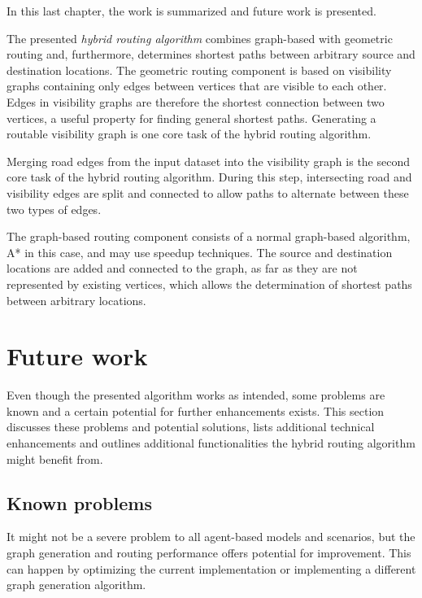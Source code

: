 
In this last chapter, the work is summarized and future work is presented.

The presented \emph{hybrid routing algorithm} combines graph-based with geometric routing and, furthermore, determines shortest paths between arbitrary source and destination locations.
The geometric routing component is based on visibility graphs containing only edges between vertices that are visible to each other.
Edges in visibility graphs are therefore the shortest connection between two vertices, a useful property for finding general shortest paths.
Generating a routable visibility graph is one core task of the hybrid routing algorithm.

Merging road edges from the input dataset into the visibility graph is the second core task of the hybrid routing algorithm.
During this step, intersecting road and visibility edges are split and connected to allow paths to alternate between these two types of edges.

The graph-based routing component consists of a normal graph-based algorithm, A* in this case, and may use speedup techniques.
The source and destination locations are added and connected to the graph, as far as they are not represented by existing vertices, which allows the determination of shortest paths between arbitrary locations.
	
\section{Future work}
\label{sec:future-work}

	Even though the presented algorithm works as intended, some problems are known and a certain potential for further enhancements exists.
	This section discusses these problems and potential solutions, lists additional technical enhancements and outlines additional functionalities the hybrid routing algorithm might benefit from.

	\subsection{Known problems}
	
		It might not be a severe problem to all agent-based models and scenarios, but the graph generation and routing performance offers potential for improvement.
		This can happen by optimizing the current implementation or implementing a different graph generation algorithm.
		
